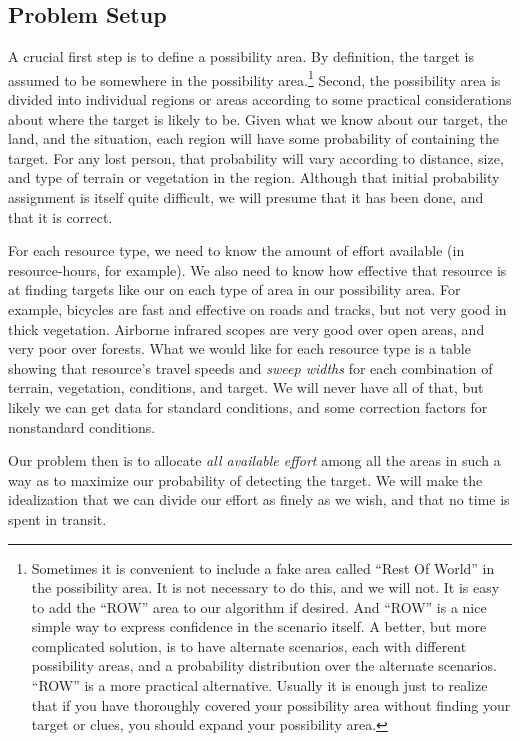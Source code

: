 \subsection{Problem Setup}
\label{sec:problem-setup}

A crucial first step is to define a possibility area. By definition,
the target is assumed to be somewhere in the possibility
area.\footnote{Sometimes it is convenient to include a fake area
  called ``Rest Of World'' in the possibility area. It is not
  necessary to do this, and we will not. It is easy to add the ``ROW''
  area to our algorithm if desired. And ``ROW'' is a nice simple way
  to express confidence in the scenario itself. A better, but more
  complicated solution, is to have alternate scenarios, each with
  different possibility areas, and a probability distribution over the
  alternate scenarios. ``ROW'' is a more practical alternative.
  Usually it is enough just to realize that if you have thoroughly
  covered your possibility area without finding your target or clues,
  you should expand your possibility area.} Second, the possibility
area is divided into individual regions or areas according to some
practical considerations about where the target is likely to be. Given
what we know about our target, the land, and the situation, each
region will have some probability of containing the target. For any
lost person, that probability will vary according to distance, size,
and type of terrain or vegetation in the region. Although that initial
probability assignment is itself quite difficult, we will presume that
it has been done, and that it is correct.

For each resource type, we need to know the amount of effort available
(in resource-hours, for example). We also need to know how effective
that resource is at finding targets like our on each type of area in
our possibility area. For example, bicycles are fast and
effective on roads and tracks, but not very good in thick
vegetation. Airborne infrared scopes are very good over open areas,
and very poor over forests. What we would like for each resource type
is a table showing that resource's travel speeds and \emph{sweep
  widths} for each combination of terrain, vegetation, conditions, and
target. We will never have all of that, but likely we can get data for
standard conditions, and some correction factors for nonstandard
conditions. 

Our problem then is to allocate \emph{all available effort} among all
the areas in such a way as to maximize our probability of detecting
the target. We will make the idealization that we can divide our
effort as finely as we wish, and that no time is spent in transit. 

